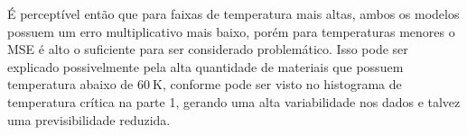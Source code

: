 É perceptível então que para faixas de temperatura mais altas, ambos os modelos possuem um erro multiplicativo mais baixo, porém para temperaturas menores o MSE é alto o suficiente para ser considerado problemático. Isso pode ser explicado possivelmente pela alta quantidade de materiais que possuem temperatura abaixo de $60~\text{K}$, conforme pode ser visto no histograma de temperatura crítica na parte 1, gerando uma alta variabilidade nos dados e talvez uma previsibilidade reduzida.